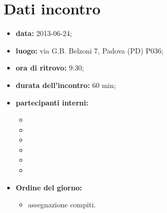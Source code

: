 \section{Dati incontro} {
	\begin{itemize}
		\item \textbf{data:} 2013-06-24;
		\item \textbf{luogo:} via G.B. Belzoni 7, Padova (PD) P036;
		\item \textbf{ora di ritrovo:} 9:30;
		\item \textbf{durata dell'incontro:} 60 min;
		\item \textbf{partecipanti interni:}
		\begin{itemize}
			\item[] \MB
			\item[] \DC
			\item[] \SL
			\item[] \VP
			\item[] \FZ
			\item[] \EZ
		\end{itemize}
		\item \textbf{Ordine del giorno:}
		\begin{itemize}
			\item assegnazione compiti.
		\end{itemize}
	\end{itemize}
}